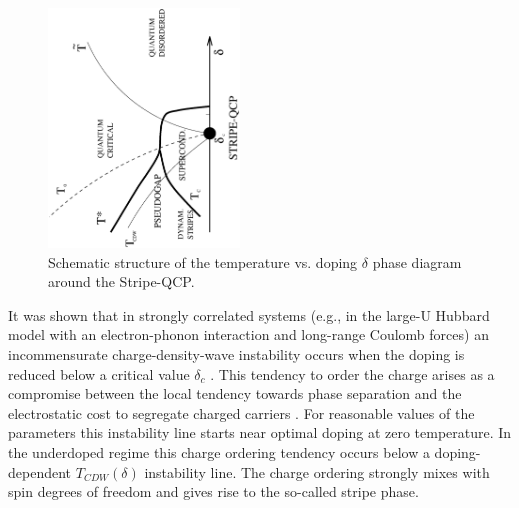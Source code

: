 \documentclass[twoside]{article}
\begin{document}
\begin{figure}
\begin{center}
\includegraphics[width=12pc,height=15pc,angle=-90]{Fig1.ps}
\caption{Schematic structure of the temperature vs. doping $\delta$ phase 
diagram around the Stripe-QCP.}
\label{fsmodel}
\end{center}
\end{figure}

It was shown that in strongly correlated systems (e.g., in the 
large-U Hubbard model with an 
electron-phonon interaction and long-range Coulomb forces) an incommensurate 
charge-density-wave instability occurs when the doping is reduced below a 
critical value $\delta_c$ \cite{prl95,prb96,jpcs98}. This tendency to order 
the charge arises as a compromise between the local tendency towards phase 
separation and the electrostatic cost to segregate charged carriers \cite{PS}. 
For reasonable values of the parameters this 
instability line starts near optimal doping at zero temperature. In the 
underdoped regime this charge ordering tendency occurs below a 
doping-dependent $T_{CDW}(\delta)$ instability line. The charge ordering 
strongly mixes with spin degrees of freedom and gives rise to the so-called 
stripe phase. 
\end{document}
